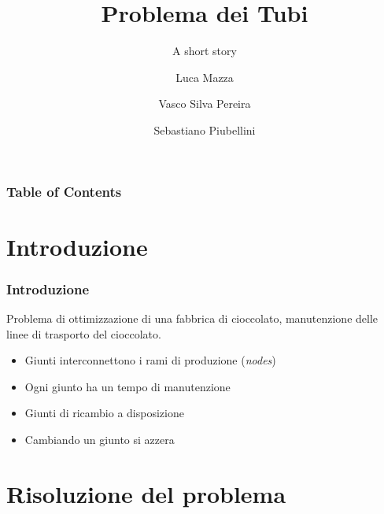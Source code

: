 \documentclass{beamer}
\title[Problema dei Tubi] %
{Problema dei Tubi}
\subtitle{A short story}
\author[GR03A] %
{Luca Mazza \and Vasco Silva Pereira \and Sebastiano Piubellini}
\begin{document}
\frame{\titlepage}


\begin{frame}
\frametitle{Table of Contents}
\tableofcontents
\end{frame}


\section{Introduzione}

\begin{frame}
\frametitle{Introduzione}
Problema di ottimizzazione di una fabbrica di cioccolato,
manutenzione delle linee di trasporto del cioccolato.

\begin{itemize}
    \item Giunti interconnettono i rami di produzione (\textit{nodes})
    \item Ogni giunto ha un tempo di manutenzione
    \item Giunti di ricambio a disposizione
    \item Cambiando un giunto si azzera
\end{itemize}
\end{frame}



\section{Risoluzione del problema}
\end{document}
